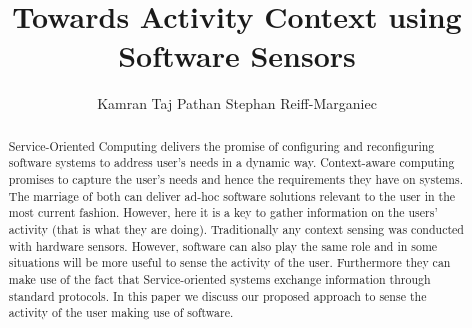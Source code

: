 \documentclass[copyright,creativecommons,noderivs,noncommercial]{eptcs}
\title{Towards Activity Context using Software Sensors}
\author{Kamran Taj Pathan \qquad Stephan Reiff-Marganiec
\institute{Department of Computer Science\\
University of Leicester\\ Leicester, UK}
\email{\{ktp2,srm13\}@le.ac.uk}
}
\begin{document}
\maketitle

\begin{abstract}
Service-Oriented Computing delivers the promise of configuring and reconfiguring software systems to address user's needs in a dynamic way. Context-aware computing promises to capture the user's needs and hence the requirements they have on systems. The marriage of both can deliver ad-hoc software solutions relevant to the user in the most current fashion. However, here it is a key to gather information on the users' activity (that is what they are doing). Traditionally any context sensing was conducted with hardware sensors. However, software can also play the same role and in some situations will be more useful to sense the activity of the user. Furthermore they can make use of the fact that Service-oriented systems exchange information through standard protocols. In this paper we discuss our proposed approach to sense the activity of the user making use of software.
\end{abstract}
\end{document}
